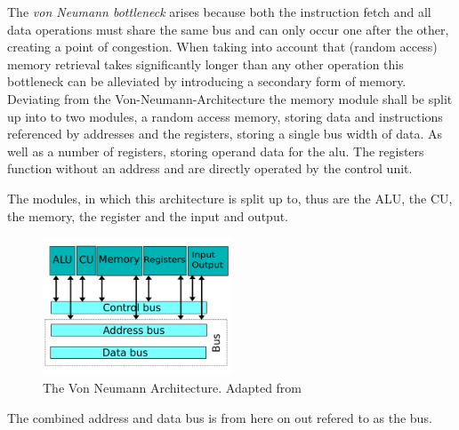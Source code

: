 The \textit{von Neumann bottleneck} arises because both the instruction fetch and all data operations must share the same bus and can only occur one after the other, creating a point of congestion. When taking into account that (random access) memory retrieval takes significantly longer than any other operation this bottleneck can be alleviated by introducing a secondary form of memory. Deviating from the Von-Neumann-Architecture the memory module shall be split up into to two modules, a random access memory, storing data and instructions referenced by addresses and the registers, storing a single bus width of data. As well as a number of registers, storing operand data for the alu. The registers function without an address and are directly operated by the control unit.

The modules, in which this architecture is split up to, thus are the ALU, the CU, the memory, the register and the input and output. 

\begin{figure}[H]
  \begin{center}
    \includegraphics[width=0.5\textwidth]{figures/VNA-Adapted}
  \end{center}
  \caption{The Von Neumann Architecture. Adapted from \cite{fig-vna}}\label{fig:vna-adapted}
\end{figure}

The combined address and data bus is from here on out refered to as the bus.

